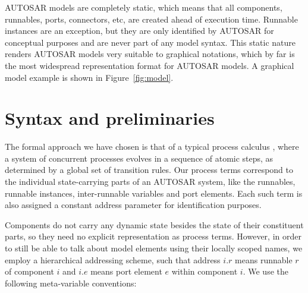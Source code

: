 \documentclass[10pt,conference]{IEEEtran}
\begin{document}
AUTOSAR models are completely static, which means that all components, runnables, ports, connectors, etc, are created ahead of execution time. Runnable instances are an exception, but they are only identified by AUTOSAR for conceptual purposes and are never part of any model syntax. This static nature renders AUTOSAR models very suitable to graphical notations, which by far is the most widespread representation format for AUTOSAR models. A graphical model example is shown in Figure~\ref{fig:model}.


\section{Syntax and preliminaries}
\label{sec:Calc}

The formal approach we have chosen is that of a typical process calculus \cite{milner:ComMob}, where a system of concurrent processes evolves in a sequence of atomic steps, as determined by a global set of transition rules. Our process terms correspond to the individual state-carrying parts of an AUTOSAR system, like the runnables, runnable instances, inter-runnable variables and port elements. Each such term is also assigned a constant address parameter for identification purposes.

Components do not carry any dynamic state besides the state of their constituent parts, so they need no explicit representation as process terms. However, in order to still be able to talk about model elements using their locally scoped names, we employ a hierarchical addressing scheme, such that address $i.r$ means runnable $r$ of component $i$ and $i.e$ means port element $e$ within component $i$. We use the following meta-variable conventions:
\end{document}

